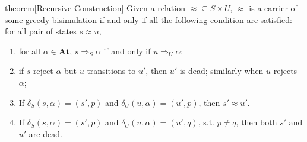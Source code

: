 \documentclass[conference]{IEEEtran}
\newcommand{\At}{\mathbf{At}}
\newcommand{\transAcc}[2]{⇒_{#1} #2}
\begin{document}
\begin{theoremEnd}{theorem}[Recursive Construction]\label{thm:recursive-construction}
    Given a relation \({≈} ⊆ S × U\), \(≈\) is a carrier of some greedy bisimulation if and only if all the following condition are satisfied: for all pair of states \(s ≈ u\),
    \begin{enumerate}
        \item\label{itm:acc-condition} for all \(α ∈ \At\), 
        \(s \transAcc{S}{α}\) if and only if \(u \transAcc{U}{α}\);
        \item\label{itm:rej-or-dead} if \(s\) reject \(α\) but \(u\) transitions to \(u'\), then \(u'\) is dead; similarly when \(u\) rejects \(α\);  
        \item\label{itm:transition-bisim} If \(δ_{S}(s, α) = (s', p)\) and \(δ_{U}(u, α) = (u', p)\), then \(s' ≈ u'\).
        \item\label{itm:transition-dead} If \(δ_{S}(s, α) = (s', p)\) and \(δ_{U}(u, α) = (u', q)\), s.t. \(p ≠ q\), then both \(s'\) and \(u'\) are dead.
    \end{enumerate}
\end{theoremEnd}
\end{document}
